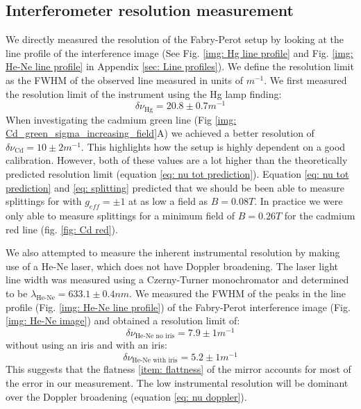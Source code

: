 \documentclass[11pt]{article}
\begin{document}
\subsection{Interferometer resolution measurement} \label{sec: resolution measurement}
We directly measured the resolution of the Fabry-Perot setup by looking at the line profile of the interference image (See Fig. \ref{img: Hg line profile} and Fig. \ref{img: He-Ne line profile} in Appendix \ref{sec: Line profiles}). We define the resolution limit as the FWHM of the observed line measured in units of $\si{m^{-1}}$. We first measured the resolution limit of the instrument using the Hg lamp finding: 
\begin{equation}
    \delta \nu_{\text{Hg}} = 20.8 \pm 0.7 \si{m^{-1}}
\end{equation}
When investigating the cadmium green line (Fig \ref{img: Cd_green_sigma_increasing_field}A) we achieved a better resolution of $\delta \nu_{\text{Cd}} = 10 \pm 2 \si{m^{-1}}$. This highlights how the setup is highly dependent on a good calibration. However, both of these values are a lot higher than the theoretically predicted resolution limit (equation \ref{eq: nu tot prediction}). Equation \eqref{eq: nu tot prediction} and \eqref{eq: splitting} predicted that we should be been able to measure splittings for with $g_{eff} = \pm 1$ at as low a field as $B = 0.08 \si{T}$. In practice we were only able to measure splittings for a minimum field of $B = 0.26 \si{T}$ for the cadmium red line (fig. \ref{fig: Cd red}). 

We also attempted to measure the inherent instrumental resolution by making use of a He-Ne laser, which does not have Doppler broadening. The laser light line width was measured using a Czerny-Turner monochromator and determined to be $\lambda_{\text{He-Ne}} = 633.1 \pm 0.4 \si{nm}$. We measured the FWHM of the peaks in the line profile (Fig. \ref{img: He-Ne line profile}) of the Fabry-Perot interference image (Fig. \ref{img: He-Ne image}) and obtained a resolution limit of:
\begin{equation}
    \delta \nu_{\text{He-Ne no iris}} = 7.9 \pm 1 \si{m^{-1}}
\end{equation}
without using an iris and with an iris: 
\begin{equation}
    \delta \nu_{\text{He-Ne with iris}} = 5.2 \pm 1 \si{m^{-1}}
\end{equation}
This suggests that the flatness \ref{item: flattness} of the mirror accounts for most of the error in our measurement. The low instrumental resolution will be dominant over the Doppler broadening (equation \eqref{eq: nu doppler}).
\end{document}
